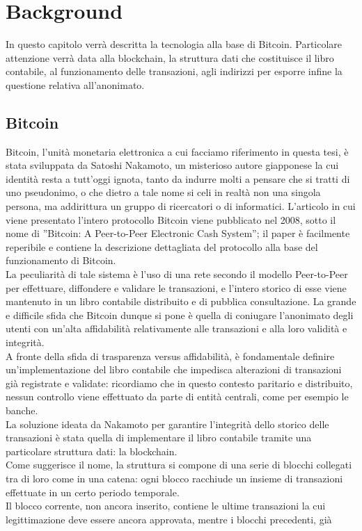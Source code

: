 \chapter{Background}
In questo capitolo verrà descritta la tecnologia alla base di Bitcoin. Particolare attenzione verrà data alla blockchain, la struttura dati che costituisce il libro contabile, al funzionamento delle transazioni, agli indirizzi per esporre infine la questione relativa all'anonimato. 
\section{Bitcoin}
Bitcoin, l’unità monetaria elettronica a cui facciamo riferimento in questa tesi, è stata sviluppata da Satoshi Nakamoto, un misterioso autore giapponese la cui identità resta a tutt'oggi ignota, tanto da indurre molti a pensare che si tratti di uno pseudonimo, o che dietro a tale nome si celi in realtà non una singola persona, ma addirittura un gruppo di ricercatori o di informatici. L’articolo in cui viene presentato l’intero protocollo Bitcoin viene pubblicato nel 2008, sotto il nome di ”Bitcoin: A Peer-to-Peer Electronic Cash System”\cite{nakamoto2009bitcoin}; il paper è facilmente reperibile e contiene la descrizione dettagliata del protocollo alla base del funzionamento di Bitcoin.\\La peculiarità di tale sistema è l’uso di una rete secondo il modello Peer-to-Peer per effettuare, diffondere e validare le transazioni, e l’intero storico di esse viene mantenuto in un libro contabile distribuito e di pubblica consultazione. La grande e difficile sfida che Bitcoin dunque si pone è quella di coniugare l’anonimato degli utenti con un’alta affidabilità relativamente alle transazioni e alla loro validità e integrità.\\A fronte della sfida di trasparenza versus affidabilità, è fondamentale definire un’implementazione del libro contabile che impedisca alterazioni di transazioni già registrate e validate: ricordiamo che in questo contesto paritario e distribuito, nessun controllo viene effettuato da parte di entità centrali, come per esempio le banche.\\
La soluzione ideata da Nakamoto per garantire l’integrità dello storico delle transazioni è stata quella di implementare il libro contabile tramite una particolare struttura dati: la blockchain.\\Come suggerisce il nome, la struttura si compone di una serie di blocchi collegati tra di loro come in una catena: ogni blocco racchiude un insieme di transazioni effettuate in un certo periodo temporale.\\Il blocco corrente, non ancora inserito, contiene le ultime transazioni la cui legittimazione deve essere ancora approvata, mentre i blocchi precedenti, già
